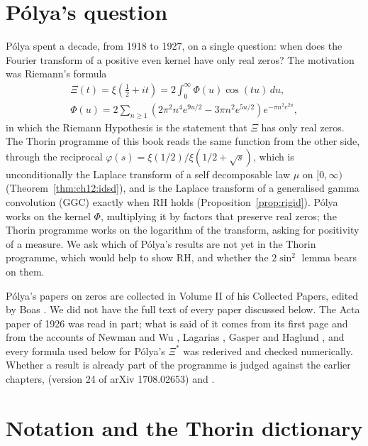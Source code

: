 \section{P\'olya's question}\label{pol:sec:intro}

P\'olya spent a decade, from 1918 to 1927, on a single question: when does the Fourier transform of a positive even kernel have only real zeros? The motivation was Riemann's formula
\begin{equation}\label{pol:eq:riemann}
\begin{gathered}
\Xi(t)=\xi\!\left(\tfrac12+it\right)=2\int_0^\infty \Phi(u)\cos(tu)\,du,\\[4pt]
\Phi(u)=2\sum_{n\ge1}\left(2\pi^2n^4e^{9u/2}-3\pi n^2e^{5u/2}\right)e^{-\pi n^2e^{2u}},
\end{gathered}
\end{equation}
in which the Riemann Hypothesis is the statement that $\Xi$ has only real zeros. The Thorin programme of this book reads the same function from the other side, through the reciprocal $\varphi(s)=\xi(1/2)/\xi(1/2+\sqrt s)$, which is unconditionally the Laplace transform of a self decomposable law $\mu$ on $[0,\infty)$ (Theorem~\ref{thm:ch12:idsd}), and is the Laplace transform of a generalised gamma convolution (GGC) exactly when RH holds (Proposition~\ref{prop:rigid}). P\'olya works on the kernel $\Phi$, multiplying it by factors that preserve real zeros; the Thorin programme works on the logarithm of the transform, asking for positivity of a measure. We ask which of P\'olya's results are not yet in the Thorin programme, which would help to show RH, and whether the $2\sin^2$ lemma bears on them.

P\'olya's papers on zeros are collected in Volume II of his Collected Papers, edited by Boas \cite{Kac74}. We did not have the full text of every paper discussed below. The Acta paper of 1926 \cite{Polya} was read in part; what is said of it comes from its first page and from the accounts of Newman and Wu \cite{NewmanWu20}, Lagarias \cite{Lagarias05}, Gasper \cite{Gasper08} and Haglund \cite{Haglund09}, and every formula used below for P\'olya's $\Xi^*$ was rederived and checked numerically. Whether a result is already part of the programme is judged against the earlier chapters, \cite{P17} (version 24 of arXiv 1708.02653) and \cite{P26}.

\section{Notation and the Thorin dictionary}

